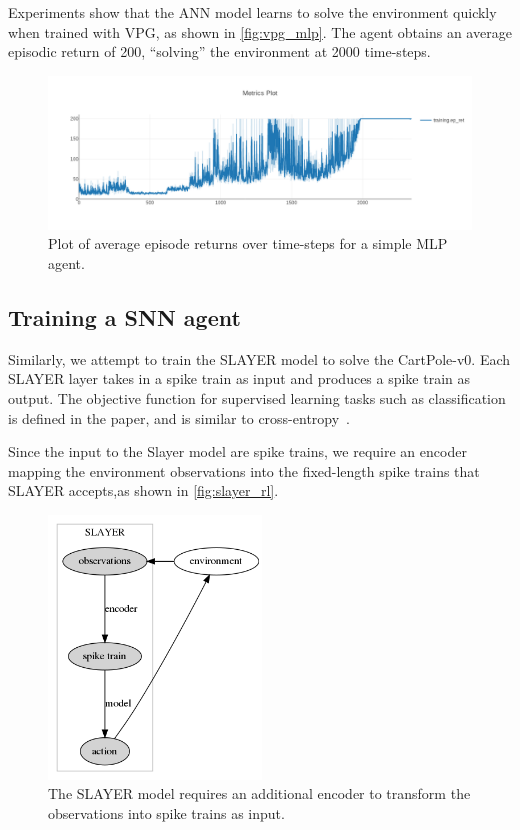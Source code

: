 \documentclass[fyp]{socreport}
\begin{document}
Experiments show that the ANN model learns to solve the environment quickly when
trained with VPG, as shown in \autoref{fig:vpg_mlp}. The agent obtains an
average episodic return of 200, ``solving'' the environment at 2000 time-steps.

\begin{figure}[htbp] \centering
\includegraphics[width=.9\linewidth]{images/vpg_mlp.png}
\caption{\label{fig:vpg_mlp} Plot of average episode returns over time-steps for
a simple MLP agent.}
\end{figure}

\subsection{Training a SNN agent}

Similarly, we attempt to train the SLAYER model to solve the CartPole-v0. Each
SLAYER layer takes in a spike train as input and produces a spike train as
output. The objective function for supervised learning tasks such as
classification is defined in the paper, and is similar to
cross-entropy~\cite{NIPS2018_7415}.

Since the input to the Slayer model are spike trains, we require an encoder
mapping the environment observations into the fixed-length spike trains that
SLAYER accepts,as shown in \autoref{fig:slayer_rl}.

\begin{figure}[htbp] \centering
\includegraphics[height=7cm]{images/snn_encode.png}
\caption{\label{fig:slayer_rl} The SLAYER model requires an additional encoder
to transform the observations into spike trains as input.}
\end{figure}
\end{document}
